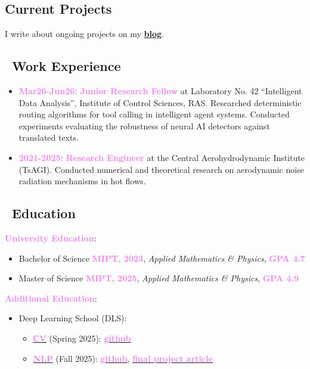 \documentclass[a4paper,12pt]{article}
\begin{document}
	\subsection*{Current Projects}
	I write about ongoing projects on my \href{https://petrovortex.github.io/en}{\textbf{blog}}.
	
	\subsection*{\faBriefcase\ Work Experience}
	\begin{itemize}
		\item \textcolor{violet}{\textbf{Mar26-Jun26:}}
		\textcolor{violet}{\textbf{Junior Research Fellow}} at Laboratory No. 42
		\enquote{Intelligent Data Analysis}, Institute of Control Sciences, RAS. Researched deterministic routing algorithms for tool calling in intelligent agent systems. Conducted experiments evaluating the robustness of neural AI detectors against translated texts.
		
		\item \textcolor{violet}{\textbf{2021-2025:}} \textcolor{violet}{\textbf{Research Engineer}} at the Central Aerohydrodynamic Institute (TsAGI). Conducted numerical and theoretical research on aerodynamic noise radiation mechanisms in hot flows. 
	\end{itemize}
	
	\subsection*{\faGraduationCap\ Education}
	\textcolor{violet}{\textbf{University Education}}: 
	\begin{itemize}
		\item Bachelor of Science \textcolor{violet}{\textbf{MIPT, 2023}}, \textit{Applied Mathematics \& Physics}, \textcolor{violet}{\textbf{GPA 4.7}}
		\item Master of Science \textcolor{violet}{\textbf{MIPT, 2025}}, \textit{Applied Mathematics \& Physics}, \textcolor{violet}{\textbf{GPA 4.9}}
	\end{itemize}
	
	\textcolor{violet}{\textbf{Additional Education}}:
	\begin{itemize}
		\item Deep Learning School (DLS): 
		\begin{itemize}
			\item \href{https://stepik.org/course/230362/syllabus}{\textcolor{violet}{\textbf{СV}}} (Spring 2025): \href{https://github.com/petrovortex/dls-homework-sem-1}{\textcolor{violet}{\textbf{github}}}
			\item \href{https://stepik.org/course/251729/syllabus}{\textcolor{violet}{\textbf{NLP}}} (Fall 2025): \href{https://github.com/petrovortex/dls-homework-sem-2}{\textcolor{violet}{\textbf{github}}}, \href{https://petrovortex.github.io/dls-agent-en/}{\textcolor{violet}{\textbf{final project article}}}
		\end{itemize}
	\end{itemize} 
	
\end{document}
